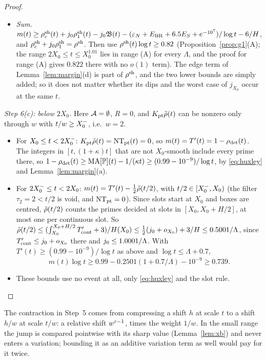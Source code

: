 \begin{proof}
\begin{itemize}
\item \emph{Sum.} $m(t)\ge\rho^{\mathrm{sh}}_c(t)+j_0\rho^{\mathrm{sh}}_1(t)-j_0\mathfrak B(t)-(\varepsilon_N+E_{\mathrm{BR}}+6.5E_S+e^{-10^7})/\log t-6/H$,
  and $\rho^{\mathrm{sh}}_c+j_0\rho^{\mathrm{sh}}_1=\rho^{\mathrm{sh}}$. Then use $\rho^{\mathrm{sh}}(t)\log t\ge0.82$ (Proposition~\ref{prop:g1}(A); the range
  $2X_0\le t\le X_0^{1.01}$ lies in range (A) for every $\Lambda$, and the proof for range (A) gives $0.822$ there with no
  $o(1)$ term). The edge term of Lemma~\ref{lem:margin}(d) is part of $\rho^{\mathrm{sh}}$, and the two lower bounds are simply added; so it
  does not matter whether its dips and the worst case of $j_{X_0}$ occur at the same $t$.
\end{itemize}

\emph{Step 6(c): below $2X_0$.} Here $\mathcal{A}=\emptyset$, $R=0$, and $K_{\mathrm{pt}}\tilde\rho(t)$ can be nonzero only through $w$ with
$t/w\ge X_0^{-}$, i.e.\ $w=2$.
\begin{itemize}
\item For $X_0\le t<2X_0^{-}$: $K_{\mathrm{pt}}\tilde\rho(t)=\mathrm{NT}_{\mathrm{pt}}(t)=0$, so $m(t)=T'(t)=1-\rho_{\mathrm{det}}(t)$. The integers in $[t,(1+\kappa)t]$
  that are not $X_0$-smooth include every prime there, so
  $1-\rho_{\mathrm{det}}(t)\ge\mathrm{MA}[\mathbb P](t)-1/(\kappa t)\ge(0.99-10^{-9})/\log t$, by \eqref{eq:huxley} and
  Lemma~\ref{lem:margin}(a).
\item For $2X_0^{-}\le t<2X_0$: $m(t)=T'(t)-\frac12\tilde\rho(t/2)$, with $t/2\in[X_0^{-},X_0)$ (the filter $\tau_2=2<t/2$ is void, and
  $\mathrm{NT}_{\mathrm{pt}}=0$). Since slots start at $X_0$ and boxes are centred, $\tilde\rho(t/2)$ counts the primes decided at slots in
  $[X_0,X_0+H/2]$, at most one per continuous slot. So
  $\tilde\rho(t/2)\le(\int_{X_0}^{X_0+H/2}T'_{\mathrm{cont}}+3)/H(X_0)\le\frac12(j_0+o_{X_0})+3/H\le0.5001/\Lambda$, since
  $T'_{\mathrm{cont}}\le j_0+o_{X_0}$ there and $j_0\le1.0001/\Lambda$. With $T'(t)\ge(0.99-10^{-9})/\log t$ as above and
  $\log t\le\Lambda+0.7$,
  \[
    m(t)\log t\ge0.99-0.2501(1+0.7/\Lambda)-10^{-9}\ge0.739 .
  \]
\item These bounds use no event at all, only \eqref{eq:huxley} and the slot rule.\qedhere
\end{itemize}
\end{proof}

\begin{remark}
The contraction in Step~5 comes from compressing a shift $h$ at scale $t$ to a shift $h/w$ at scale $t/w$: a relative shift
$w^{\varepsilon-1}$, times the weight $1/w$. In the small range the jump is compared pointwise with its sharp value
(Lemma~\ref{lem:xb}) and never enters a variation; bounding it as an additive variation term as well would pay for it twice.
\end{remark}


